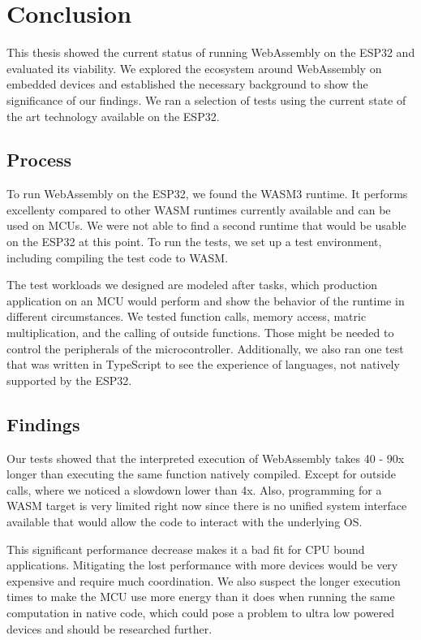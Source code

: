 
\chapter{Conclusion}\label{chapter:conclusion}

This thesis showed the current status of running WebAssembly on the ESP32 and evaluated its viability. We explored the ecosystem around WebAssembly on embedded devices and established the necessary background to show the significance of our findings. We ran a selection of tests using the current state of the art technology available on the ESP32.

\section*{Process}

To run WebAssembly on the ESP32, we found the WASM3 runtime. It performs excellenty compared to other WASM runtimes currently available and can be used on MCUs. We were not able to find a second runtime that would be usable on the ESP32 at this point. To run the tests, we set up a test environment, including compiling the test code to WASM.

The test workloads we designed are modeled after tasks, which production application on an MCU would perform and show the behavior of the runtime in different circumstances. We tested function calls, memory access, matric multiplication, and the calling of outside functions. Those might be needed to control the peripherals of the microcontroller. Additionally, we also ran one test that was written in TypeScript to see the experience of languages, not natively supported by the ESP32.

\section*{Findings}

Our tests showed that the interpreted execution of WebAssembly takes 40 - 90x longer than executing the same function natively compiled. Except for outside calls, where we noticed a slowdown lower than 4x. Also, programming for a WASM target is very limited right now since there is no unified system interface available that would allow the code to interact with the underlying OS.

This significant performance decrease makes it a bad fit for CPU bound applications. Mitigating the lost performance with more devices would be very expensive and require much coordination. We also suspect the longer execution times to make the MCU use more energy than it does when running the same computation in native code, which could pose a problem to ultra low powered devices and should be researched further.

